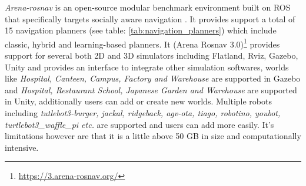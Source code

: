 \textit{Arena-rosnav} is an open-source  modular benchmark environment built on ROS that specifically targets
socially aware navigation \cite{arenarosnav}. It provides support a total of 15 navigation planners (see table: \ref{tab:navigation_planners})
which include classic, hybrid and learning-based planners. It (Arena Rosnav 3.0)\footnote{\href{https://3.arena-rosnav.org/}{https://3.arena-rosnav.org/}} provides 
support for several both 2D and 3D simulators including Flatland, Rviz, Gazebo, Unity and provides 
an interface to integrate other simulation softwares, worlds like  
\textit{Hospital, Canteen, Campus, Factory and Warehouse} are supported in Gazebo and 
\textit{Hospital, Restaurant School, Japanese Garden and Warehouse} are supported in Unity,
additionally users can add or create new worlds. Multiple robots including 
\textit{tutlebot3-burger, jackal, ridgeback, agv-ota, tiago, robotino, youbot, turtlebot3\_waffle\_pi etc.} 
are supported and users can add more easily. It's limitations however are that it is a little above 
50 GB in size and computationally intensive. 

    
